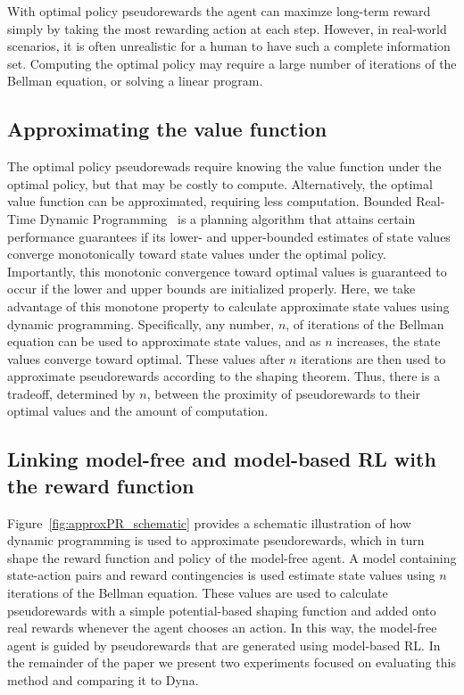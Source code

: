 \documentclass[letterpaper]{article}
\begin{document}
With optimal policy pseudorewards the agent can maximze long-term reward simply by taking the most rewarding action at each step. However, in real-world scenarios, it is often unrealistic for a human to have such a complete information set. Computing the optimal policy may require a large number of iterations of the Bellman equation, or solving a linear program.

\subsection{Approximating the value function}

The optimal policy pseudorewads require knowing the value function under the optimal policy, but that may be costly to compute. Alternatively, the optimal value function can be approximated, requiring less computation. Bounded Real-Time Dynamic Programming~\cite{mcmahan2005bounded} is a planning algorithm that attains certain performance guarantees if its lower- and upper-bounded estimates of state values converge monotonically toward state values under the optimal policy. Importantly, this monotonic convergence toward optimal values is guaranteed to occur if the lower and upper bounds are initialized properly. Here, we take advantage of this monotone property to calculate approximate state values using dynamic programming. Specifically, any number, $n$, of iterations of the Bellman equation can be used to approximate state values, and as $n$ increases, the state values converge toward optimal. These values after $n$ iterations are then used to approximate pseudorewards according to the shaping theorem. Thus, there is a tradeoff, determined by $n$, between the proximity of pseudorewards to their optimal values and the amount of computation.

\subsection{Linking model-free and model-based RL with the reward function}

Figure~\ref{fig:approxPR_schematic} provides a schematic illustration of how dynamic programming is used to approximate pseudorewards, which in turn shape the reward function and policy of the model-free agent. A model containing state-action pairs and reward contingencies is used estimate state values using $n$ iterations of the Bellman equation. These values are used to calculate pseudorewards with a simple potential-based shaping function and added onto real rewards whenever the agent chooses an action. In this way, the model-free agent is guided by pseudorewards that are generated using model-based RL. In the remainder of the paper we present two experiments focused on evaluating this method and comparing it to Dyna.
\end{document}
